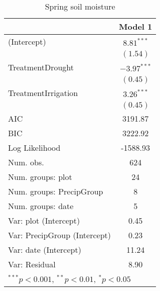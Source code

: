 
\begin{table}[!h]
\caption{Spring soil moisture}
\begin{center}
\begin{tabular}{l c }
\hline
 & Model 1 \\
\hline
(Intercept)                  & $8.81^{***}$  \\
                             & $(1.54)$      \\
TreatmentDrought             & $-3.97^{***}$ \\
                             & $(0.45)$      \\
TreatmentIrrigation          & $3.26^{***}$  \\
                             & $(0.45)$      \\
\hline
AIC                          & 3191.87       \\
BIC                          & 3222.92       \\
Log Likelihood               & -1588.93      \\
Num. obs.                    & 624           \\
Num. groups: plot            & 24            \\
Num. groups: PrecipGroup     & 8             \\
Num. groups: date            & 5             \\
Var: plot (Intercept)        & 0.45          \\
Var: PrecipGroup (Intercept) & 0.23          \\
Var: date (Intercept)        & 11.24         \\
Var: Residual                & 8.90          \\
\hline
\multicolumn{2}{l}{\scriptsize{$^{***}p<0.001$, $^{**}p<0.01$, $^*p<0.05$}}
\end{tabular}
\label{table:spotVWC}
\end{center}
\end{table}
